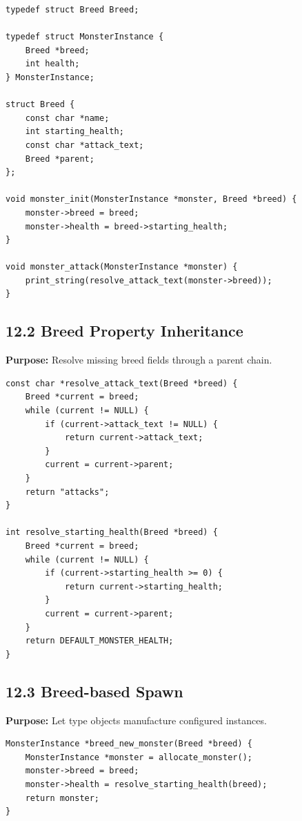 \documentclass[10pt,letterpaper]{article}
\begin{document}
\begin{verbatim}
typedef struct Breed Breed;

typedef struct MonsterInstance {
    Breed *breed;
    int health;
} MonsterInstance;

struct Breed {
    const char *name;
    int starting_health;
    const char *attack_text;
    Breed *parent;
};

void monster_init(MonsterInstance *monster, Breed *breed) {
    monster->breed = breed;
    monster->health = breed->starting_health;
}

void monster_attack(MonsterInstance *monster) {
    print_string(resolve_attack_text(monster->breed));
}
\end{verbatim}

\subsection{12.2 Breed Property Inheritance}

\textbf{Purpose:} Resolve missing breed fields through a parent chain.

\begin{verbatim}
const char *resolve_attack_text(Breed *breed) {
    Breed *current = breed;
    while (current != NULL) {
        if (current->attack_text != NULL) {
            return current->attack_text;
        }
        current = current->parent;
    }
    return "attacks";
}

int resolve_starting_health(Breed *breed) {
    Breed *current = breed;
    while (current != NULL) {
        if (current->starting_health >= 0) {
            return current->starting_health;
        }
        current = current->parent;
    }
    return DEFAULT_MONSTER_HEALTH;
}
\end{verbatim}

\subsection{12.3 Breed-based Spawn}

\textbf{Purpose:} Let type objects manufacture configured instances.

\begin{verbatim}
MonsterInstance *breed_new_monster(Breed *breed) {
    MonsterInstance *monster = allocate_monster();
    monster->breed = breed;
    monster->health = resolve_starting_health(breed);
    return monster;
}
\end{verbatim}
\end{document}
